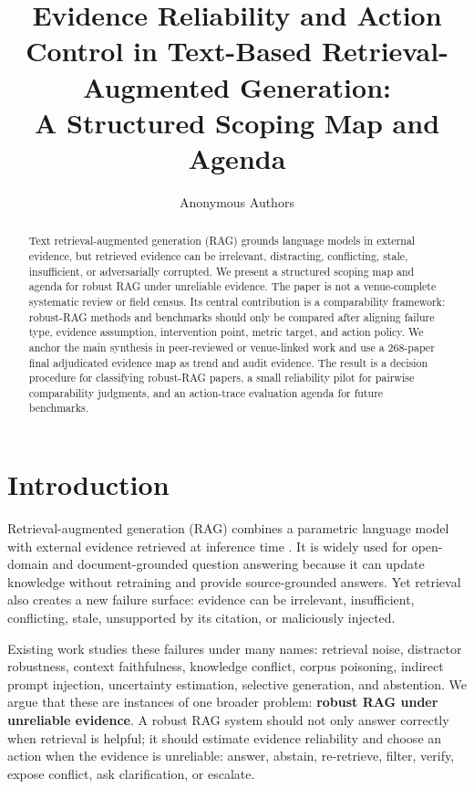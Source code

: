 \documentclass[11pt]{article}
\title{Evidence Reliability and Action Control in Text-Based Retrieval-Augmented Generation:\\
A Structured Scoping Map and Agenda}
\author{Anonymous Authors}
\date{}
\begin{document}
\maketitle

\begin{abstract}
Text retrieval-augmented generation (RAG) grounds language models in external evidence, but retrieved evidence can be irrelevant, distracting, conflicting, stale, insufficient, or adversarially corrupted. We present a structured scoping map and agenda for robust RAG under unreliable evidence. The paper is not a venue-complete systematic review or field census. Its central contribution is a comparability framework: robust-RAG methods and benchmarks should only be compared after aligning failure type, evidence assumption, intervention point, metric target, and action policy. We anchor the main synthesis in peer-reviewed or venue-linked work and use a 268-paper final adjudicated evidence map as trend and audit evidence. The result is a decision procedure for classifying robust-RAG papers, a small reliability pilot for pairwise comparability judgments, and an action-trace evaluation agenda for future benchmarks.
\end{abstract}

\section{Introduction}

Retrieval-augmented generation (RAG) combines a parametric language model with external evidence retrieved at inference time \citep{lewis2020rag}. It is widely used for open-domain and document-grounded question answering because it can update knowledge without retraining and provide source-grounded answers. Yet retrieval also creates a new failure surface: evidence can be irrelevant, insufficient, conflicting, stale, unsupported by its citation, or maliciously injected.

Existing work studies these failures under many names: retrieval noise, distractor robustness, context faithfulness, knowledge conflict, corpus poisoning, indirect prompt injection, uncertainty estimation, selective generation, and abstention. We argue that these are instances of one broader problem: \textbf{robust RAG under unreliable evidence}. A robust RAG system should not only answer correctly when retrieval is helpful; it should estimate evidence reliability and choose an action when the evidence is unreliable: answer, abstain, re-retrieve, filter, verify, expose conflict, ask clarification, or escalate.
\end{document}
